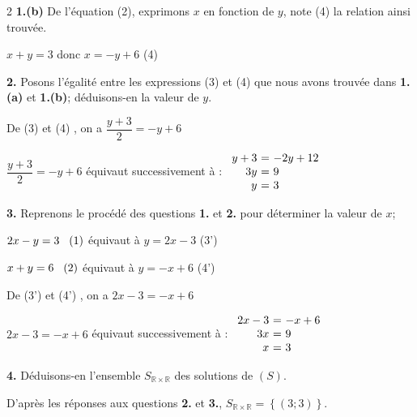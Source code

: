 \begin{multicols*}{2}
  	\textbf{1.(b)} De l'équation (2), exprimons $x$ en fonction de $y$, note (4) la relation ainsi trouvée. 
  	
  	$x+y=3$ donc $x=-y+6$ (4) 
  	
  	\textbf{2.} Posons l'égalité entre les expressions  (3) et (4)  que nous avons trouvée dans \textbf{1.(a)} et \textbf{1.(b)}; déduisons-en la valeur de $y$.
  	
  	De (3) et (4) , on a $\dfrac{y+3}{2}=-y+6$ 
  	
  	$\dfrac{y+3}{2}=-y+6$  équivaut successivement à :
  	$\begin{array}{r@{\ =\ }l} 
  		y+3&-2y+12\\
  		3y	& 9 \\ 	
  		y	&3 \\ 
  	\end{array}$ 
  	
  	\textbf{3.} Reprenons  le procédé des questions  \textbf{1.} et \textbf{2.} pour déterminer la valeur de $x$;
  	
  	$2x-y=3 \hspace{0.3cm} (1)$ équivaut à $y=2x-3$  (3')
  	
  	$x+y=6 \hspace{0.3cm} (2)$ équivaut à $y=-x+6$  (4')
  	
  	De (3') et (4') , on a $2x-3=-x+6$
  	
  	$2x-3=-x+6$  équivaut successivement à :
  	$\begin{array}{r@{\ =\ }l} 
  		2x-3&-x+6\\
  		3x	& 9 \\ 	
  		x	&3 \\ 
  	\end{array}$ 
  	
  	\textbf{4.} Déduisons-en l'ensemble $S_{\mathbb{R}\times \mathbb{R}}$  des solutions de $(S)$.
  	
  	D'après les réponses aux questions \textbf{2.} et  \textbf{3.}, $S_{\mathbb{R}\times \mathbb{R}}= \left\{\left(3;3\right)\right\}$.
  	
  	

\end{multicols*}
